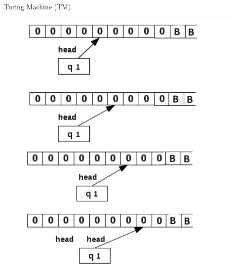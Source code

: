 \documentclass{beamer}
\begin{document}
\begin{frame}{Turing Machine (TM)} 
	\begin{figure}
		\includegraphics[scale=.45]{img5/m11}
	\end{figure}
\end{frame}	
\end{document}
